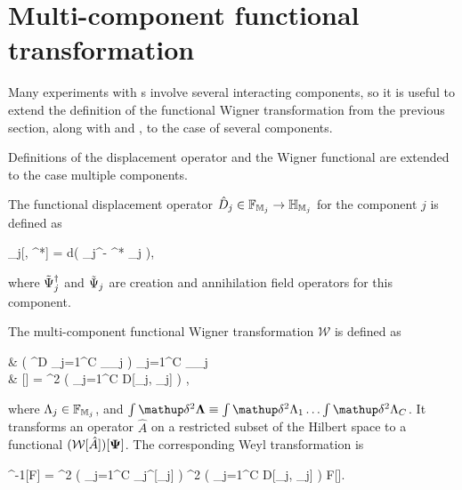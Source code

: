 \section{Multi-component functional transformation}

Many experiments with s involve several interacting components, so it is useful to extend the definition of the functional Wigner transformation from the previous section, along with  and , to the case of several components.

Definitions of the displacement operator and the Wigner functional are extended to the case multiple components.

\begin{definition}
	The functional displacement operator $\hat{D}_j \in \mathbb{F}_{\mathbb{M}_j} \rightarrow \mathbb{H}_{\mathbb{M}_j}$ for the component $j$ is defined as
	\begin{eqn*}
		_j[\Lambda, \Lambda^*] = \exp \int d\xvec \left(
			\Lambda \Psiop_j^\dagger - \Lambda^* \Psiop_j
		\right),
	\end{eqn*}
	where $\tilde{\Psi}_j^\dagger$ and $\tilde{\Psi}_j$ are creation and annihilation field operators for this component.
\end{definition}

\begin{definition}
\label{def:wigner:mc:w-transformation}
	The multi-component functional Wigner transformation $\mathcal{W}$ is defined as
	\begin{eqn*}
		&  \in \left( ^D \rightarrow \prod_{j=1}^C _{\restbasis_j} \right)
			\rightarrow \prod_{j=1}^C _{\restbasis_j}
			\rightarrow \mathbb{C} \\
		& [\hat{A}]
		=  \int \fdelta^2 \bLambda
			\left( \prod_{j=1}^C D[\Lambda_j, \Psi_j] \right)
			\Trace{ \hat{A} \prod_{j=1}^C \hat{D}_j[\Lambda_j] },
	\end{eqn*}
	where $\Lambda_j \in \mathbb{F}_{\mathbb{M}_j}$, and $\int \fdelta^2 \bLambda \equiv \int \fdelta^2 \Lambda_1 \ldots \int \fdelta^2 \Lambda_C$.
	It transforms an operator $\hat{A}$ on a restricted subset of the Hilbert space to a functional $(\mathcal{W}[\hat{A}])[\mathbf{\Psi}]$.
	The corresponding Weyl transformation is
	\begin{eqn*}
		^{-1}[F]
		=  \int \fdelta^2 \bXi
			\left( \prod_{j=1}^C _j^{\dagger}[\Xi_j] \right)
			\int \fdelta^2 \bPhi
				\left( \prod_{j=1}^C D[\Phi_j, \Xi_j] \right)
				F[\bPhi].
	\end{eqn*}
\end{definition}

